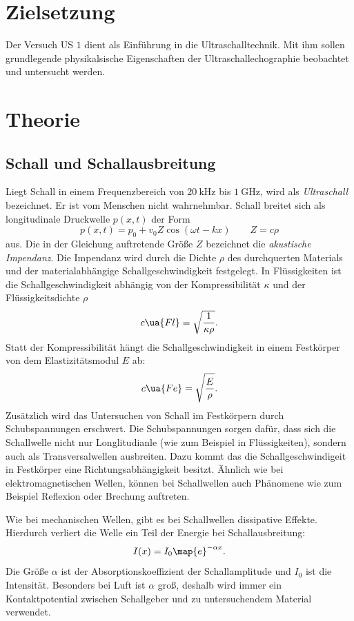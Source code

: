 \setcounter{page}{1}
\section*{Zielsetzung}
Der Versuch US $1$ dient als Einführung in die Ultraschalltechnik.
Mit ihm sollen grundlegende physikalsische Eigenschaften der
Ultraschallechographie beobachtet und untersucht werden.
\section{Theorie}
\subsection{Schall und Schallausbreitung}
Liegt Schall in einem Frequenzbereich von $\SI{20}{\kilo\hertz}$ bis $\SI{1}{\giga\hertz}$,
wird als \emph{Ultraschall} bezeichnet. Er ist vom Menschen nicht wahrnehmbar.
Schall breitet sich als longitudinale Druckwelle $p(x,t)$ der Form
\begin{equation*}
  p(x,t)=p_0+v_0 Z \cos(\omega t - kx) \qquad Z=c\rho
\end{equation*}
aus. Die in der Gleichung auftretende Größe $Z$ bezeichnet die \emph{akustische Impendanz}.
Die Impendanz wird durch die Dichte $\rho$ des durchquerten Materials und der
materialabhängige Schallgeschwindigkeit festgelegt.
In Flüssigkeiten ist die Schallgeschwindigkeit abhängig von der
Kompressibilität $\kappa$ und der Flüssigkeitsdichte $\rho$
\begin{equation*}
  c\ua{Fl}=\sqrt{\frac{1}{\kappa\rho}}.
\end{equation*}
Statt der Kompressibilität hängt die Schallgeschwindigkeit in einem Festkörper von
dem Elastizitätsmodul $E$ ab:
\begin{equation*}
  c\ua{Fe}=\sqrt{\frac{E}{\rho}}.
\end{equation*}
Zusätzlich wird das Untersuchen von Schall im Festkörpern durch Schubspannungen
erschwert. Die Schubspannungen sorgen dafür, dass sich die Schallwelle nicht nur
Longlitudianle (wie zum Beispiel in Flüssigkeiten), sondern auch als
Transversalwellen ausbreiten.
Dazu kommt das die Schallgeschwindigeit in Festkörper eine Richtungsabhängigkeit
besitzt.
Ähnlich wie bei elektromagnetischen Wellen, können bei Schallwellen auch
Phänomene wie zum Beispiel Reflexion oder Brechung auftreten.

Wie bei mechanischen Wellen, gibt es bei Schallwellen dissipative Effekte.
Hierdurch verliert die Welle ein Teil der Energie bei Schallausbreitung:
\begin{equation}
  \label{eq:abfall}
  I(x)=I_0\map{e}^{-\alpha x}.
\end{equation}
Die Größe $\alpha$ ist der Absorptionskoeffizient der Schallamplitude und $I_0$ ist die
Intensität.
Besonders bei Luft ist $\alpha$ groß, deshalb wird immer ein Kontaktpotential
zwischen Schallgeber und zu untersuchendem Material verwendet.

